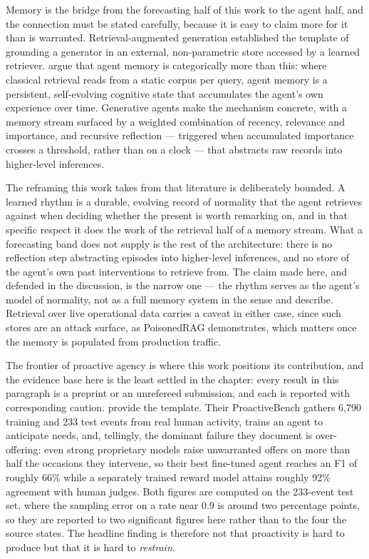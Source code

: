 Memory is the bridge from the forecasting half of this work to the agent half,
and the connection must be stated carefully, because it is easy to claim more
for it than is warranted. Retrieval-augmented generation
\citep{lewis_retrieval-augmented_2020} established the template of grounding a
generator in an external, non-parametric store accessed by a learned
retriever. \citet[a 2026 preprint]{hu_memory_2026} argue that agent memory is
categorically more than this: where classical retrieval reads from a static
corpus per query, agent memory is a persistent, self-evolving cognitive state
that accumulates the agent's own experience over time. Generative agents
\citep{park_generative_2023} make the mechanism concrete, with a memory stream
surfaced by a weighted combination of recency, relevance and importance, and
recursive reflection --- triggered when accumulated importance crosses a
threshold, rather than on a clock --- that abstracts raw records into
higher-level inferences.

The reframing this work takes from that literature is deliberately bounded. A
learned rhythm is a durable, evolving record of normality that the agent
retrieves against when deciding whether the present is worth remarking on, and
in that specific respect it does the work of the retrieval half of a memory
stream. What a forecasting band does not supply is the rest of the
architecture: there is no reflection step abstracting episodes into
higher-level inferences, and no store of the agent's own past interventions to
retrieve from. The claim made here, and defended in the discussion, is the
narrow one --- the rhythm serves as the agent's model of normality, not as a
full memory system in the sense \citet{hu_memory_2026} and
\citet{park_generative_2023} describe. Retrieval over live operational data
carries a caveat in either case, since such stores are an attack surface, as
PoisonedRAG \citep{zou_poisonedrag_2025} demonstrates, which matters once the
memory is populated from production traffic.

The frontier of proactive agency is where this work positions its contribution,
and the evidence base here is the least settled in the chapter: every result in
this paragraph is a preprint or an unrefereed submission, and each is reported
with corresponding caution. \citet[a 2024 preprint]{lu_proactive_2024} provide
the template. Their ProactiveBench gathers 6,790 training and 233 test events
from real human activity, trains an agent to anticipate needs, and, tellingly,
the dominant failure they document is over-offering: even strong proprietary
models raise unwarranted offers on more than half the occasions they intervene,
so their best fine-tuned agent reaches an F1 of roughly 66\% while a separately
trained reward model attains roughly 92\% agreement with human judges. Both
figures are computed on the 233-event test set, where the sampling error on a
rate near 0.9 is around two percentage points, so they are reported to two
significant figures here rather than to the four the source states. The
headline finding is therefore not that proactivity is hard to produce but that
it is hard to \emph{restrain}.

